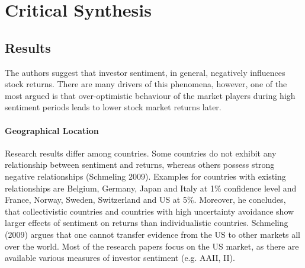 \section{Critical Synthesis} \label{criticalsynthesis}

\subsection{Results}
The authors suggest that investor sentiment, in general, negatively influences stock returns. There are many drivers of this phenomena, however, one of the most argued is that over-optimistic behaviour of the market players during high sentiment periods leads to lower stock market returns later. 

\paragraph{Geographical Location}
Research results differ among countries. Some countries do not exhibit any relationship between sentiment and returns, whereas others possess strong negative relationships (Schmeling 2009). Examples for countries with existing relationships are Belgium, Germany, Japan and Italy at 1\% confidence level and France, Norway, Sweden, Switzerland and US at 5\%. Moreover, he concludes, that collectivistic countries and countries with high uncertainty avoidance show larger effects of sentiment on returns than individualistic countries. Schmeling (2009) argues that one cannot transfer evidence from the US to other markets all over the world. Most of the research papers focus on the US market, as there are available various measures of investor sentiment (e.g. AAII, II). 

